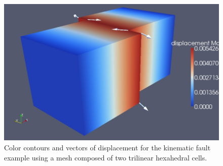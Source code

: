 \begin{figure}
  \includegraphics[scale=0.33]{examples/figs/twohex8-dislocation}
  \caption{Color contours and vectors of displacement for the kinematic fault
    example using a mesh composed of two trilinear hexahedral cells.}
  \label{fig:twohex8-disloc}
\end{figure}


